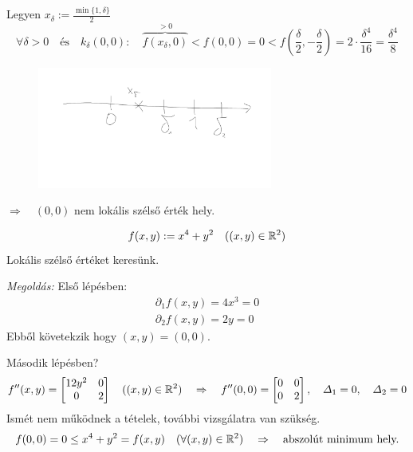 \documentclass[a4paper,11.5pt]{article}
\begin{document}
\begin{task}
		Legyen $x_\delta:=\frac{\min\{1,\delta\}}{2}$
		\[ \forall\delta>0\quad \text{és}\quad k_\delta(0,0):\quad \overbrace{f(x_\delta,0)}^{>0}<f(0,0)=0<f\left(\frac{\delta}{2},-\frac{\delta}{2}\right)=2\cdot\frac{\delta^4}{16}=\frac{\delta^4}{8} \]
		\begin{figure}[H]
			\centering
			\includegraphics[height=4cm]{../2zh/kepek/44.png}
			\caption{}
		\end{figure}
		$\Rightarrow \quad (0,0)$ nem lokális szélső érték hely.
	\end{task}
	\begin{task}
		\[ f(x,y):=x^4+y^2\quad ((x,y)\in\mathbb{R}^2) \]
		Lokális szélső értéket keresünk.
		
		\textit{Megoldás:} Első lépésben:
		\begin{align*}
			\partial_1f(x,y)=4x^3=0\\
			\partial_2f(x,y)=2y=0
		\end{align*}
		Ebből követekzik hogy $(x,y)=(0,0)$.
		
		Második lépésben?
		\[ f''(x,y)=\begin{bmatrix}
			12y^2&0\\
			0&2
		\end{bmatrix}\quad ((x,y)\in\mathbb{R}^2)\quad \Rightarrow\quad f''(0,0)=\begin{bmatrix}
		0&0\\
		0&2
		\end{bmatrix},\quad \varDelta_1=0,\quad \varDelta_2=0 \]
		Ismét nem működnek a tételek, további vizsgálatra van szükség.
		\[ f(0,0)=0\leq x^4+y^2=f(x,y)\quad (\forall(x,y)\in\mathbb{R}^2)\quad \Rightarrow\quad \text{abszolút minimum hely.} \]
	\end{task}
\end{document}
